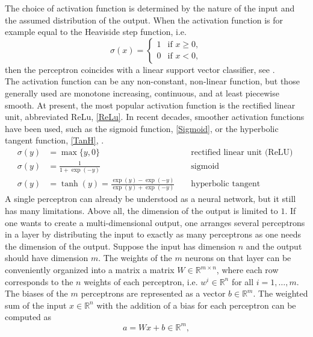 The choice of activation function is determined by the nature of the input and the assumed distribution of the output. When the activation function is for example equal to the Heaviside step function, i.e.
\begin{equation*}
    \sigma(x) = \begin{cases} 1 & \text{if } x \geq 0, \\ 0 & \text{if } x < 0, \end{cases}
\end{equation*}
then the perceptron coincides with a linear support vector classifier, see \cite[Chapter~7]{Bishop:2006}. \\
The activation function can be any non-constant, non-linear function, but those generally used are monotone increasing, continuous, and at least piecewise smooth. At present, the most popular activation function is the rectified linear unit, abbreviated ReLu, \cref{ReLu}. In recent decades, smoother activation functions have been used, such as the sigmoid function, \cref{Sigmoid}, or the hyperbolic tangent function, \cref{TanH}, \cite{}.
\begin{align}
    \sigma(y) &=\max \{y, 0\} & & \text{ rectified linear unit (ReLU) } \label{ReLu} \\
    \sigma(y) &=\frac{1}{1+\exp (-y)} & & \text{ sigmoid } \label{Sigmoid} \\
    \sigma(y) &=\tanh (y)=\frac{\exp (y)-\exp (-y)}{\exp (y)+\exp (-y)} & & \text{ hyperbolic tangent } \label{TanH}
\end{align}
A single perceptron can already be understood as a neural network, but it still has many limitations. Above all, the dimension of the output is limited to $1$. If one wants to create a multi-dimensional output, one arranges several perceptrons in a layer by distributing the input to exactly as many perceptrons as one needs the dimension of the output. Suppose the input has dimension $n$ and the output should have dimension $m$. The weights of the $m$ neurons on that layer can be conveniently organized into a matrix a matrix $W \in \mathbb{R}^{m \times n}$, where each row corresponds to the $n$ weights of each perceptron, i.e. $w^{i} \in \mathbb{R}^n$ for all $i = 1, \ldots, m$. The biases of the $m$ perceptrons are represented as a vector $b \in \mathbb{R}^m$. The weighted sum of the input $x \in \mathbb{R}^n$ with the addition of a bias for each perceptron can be computed as  
\begin{equation*}
    a = W x + b \in \mathbb{R}^m,
\end{equation*}
